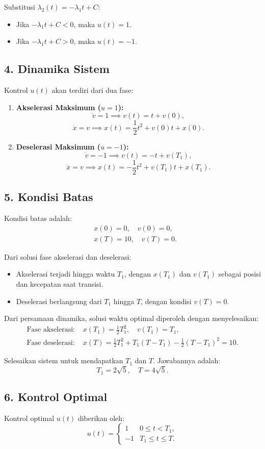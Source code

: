 \documentclass{article}
\begin{document}
Substitusi $\lambda_2(t) = -\lambda_1 t + C$:
\begin{itemize}
    \item Jika $-\lambda_1 t + C < 0$, maka $u(t) = 1$.
    \item Jika $-\lambda_1 t + C > 0$, maka $u(t) = -1$.
\end{itemize}

\subsection*{4. Dinamika Sistem}
Kontrol $u(t)$ akan terdiri dari dua fase:
\begin{enumerate}
    \item \textbf{Akselerasi Maksimum ($u = 1$):}
    \[
    \dot{v} = 1 \implies v(t) = t + v(0),
    \]
    \[
    \dot{x} = v \implies x(t) = \frac{1}{2}t^2 + v(0)t + x(0).
    \]
    \item \textbf{Deselerasi Maksimum ($u = -1$):}
    \[
    \dot{v} = -1 \implies v(t) = -t + v(T_1),
    \]
    \[
    \dot{x} = v \implies x(t) = -\frac{1}{2}t^2 + v(T_1)t + x(T_1).
    \]
\end{enumerate}

\subsection*{5. Kondisi Batas}
Kondisi batas adalah:
\[
\begin{aligned}
&x(0) = 0, \quad v(0) = 0, \\
&x(T) = 10, \quad v(T) = 0.
\end{aligned}
\]

Dari solusi fase akselerasi dan deselerasi:
\begin{itemize}
    \item Akselerasi terjadi hingga waktu $T_1$, dengan $x(T_1)$ dan $v(T_1)$ sebagai posisi dan kecepatan saat transisi.
    \item Deselerasi berlangsung dari $T_1$ hingga $T$, dengan kondisi $v(T) = 0$.
\end{itemize}

Dari persamaan dinamika, solusi waktu optimal diperoleh dengan menyelesaikan:
\[
\begin{aligned}
\text{Fase akselerasi: } & x(T_1) = \frac{1}{2}T_1^2, \quad v(T_1) = T_1, \\
\text{Fase deselerasi: } & x(T) = \frac{1}{2}T_1^2 + T_1(T - T_1) - \frac{1}{2}(T - T_1)^2 = 10.
\end{aligned}
\]

Selesaikan sistem untuk mendapatkan $T_1$ dan $T$. Jawabannya adalah:
\[
T_1 = 2\sqrt{5}, \quad T = 4\sqrt{5}.
\]

\subsection*{6. Kontrol Optimal}
Kontrol optimal $u(t)$ diberikan oleh:
\[
u(t) = \begin{cases}
1 & 0 \leq t < T_1, \\
-1 & T_1 \leq t \leq T.
\end{cases}
\]
\end{document}
